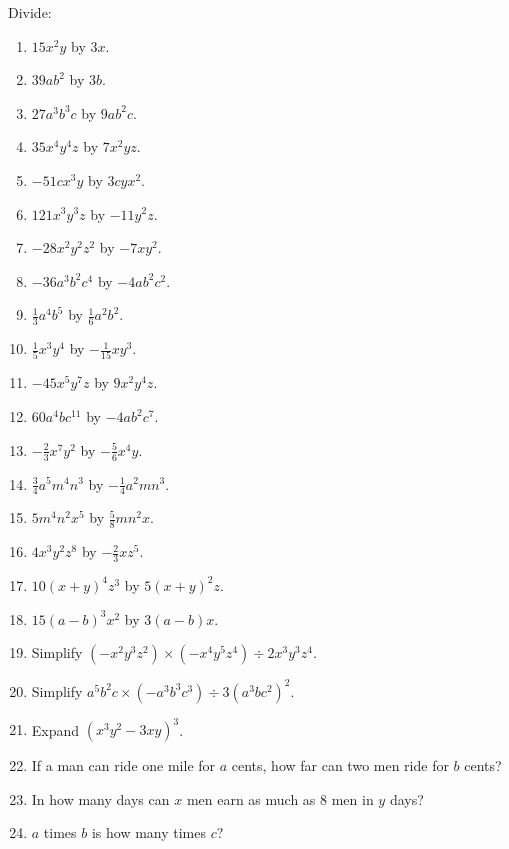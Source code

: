 \documentclass{book}
\begin{document}
Divide:
\begin{enumerate}
\item $15x^2 y$ by $3x$.

\item $39a b^2$ by $3b$.

\item $27a^3 b^3 c$ by $9ab^2 c$.

\item $35x^4 y^4 z$ by $7x^2 yz$.

\item $-51cx^3 y$ by $3cyx^2$.

\item $121x^3 y^3 z$ by $-11y^2 z$.

\item $-28x^2 y^2 z^2$ by $-7x y^2$.

\item $-36a^3 b^2 c^4$ by $-4a b^2 c^2$.

\item $\frac{1}{3} a^4 b^5$ by $\frac{1}{6} a^2 b^2$.

\item $\frac{1}{5} x^3 y^4$ by $-\frac{1}{15} xy^3$.

\item $-45x^5 y^7 z$ by $9x^2 y^4 z$.

\item $60a^4 bc^{11}$ by $-4ab^2 c^7$.

\item $-\frac{2}{3} x^7 y^2$ by $-\frac{5}{6} x^4 y$.

\item $\frac{3}{4} a^5 m^4 n^3$ by $-\frac{1}{4} a^2 mn^3$.

\item $5m^4 n^2 x^5$ by $\frac{5}{8} mn^2 x$.

\item $4x^3 y^2 z^8$ by $-\frac{2}{3} xz^5$.

\item $10(x + y)^4 z^3$ by $5(x + y)^2 z$.

\item $15(a - b)^3 x^2$ by $3(a - b)x$.

\item Simplify $(-x^{2}y^{3}z^{2}) \times (-x^{4}y^{5}z^{4}) \div 2x^{3}y^{3}z^{4}$.

\item Simplify $a^{5}b^{2}c \times (-a^{3}b^{3}c^{3}) \div 3(a^{3}bc^{2})^{2}$.

\item Expand $(x^{3}y^{2}-3xy)^{3}$.

\item If a man can ride one mile for $a$ cents, how far can
two men ride for $b$ cents?

\item In how many days can $x$ men earn as much as 8
men in $y$ days?

\item $a$ times $b$ is how many times $c$?
\end{enumerate}
\end{document}
